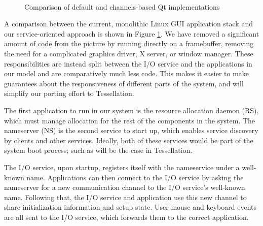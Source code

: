 \documentclass[letterpaper,twocolumn,11pt]{article}
\begin{document}
\begin{figure}[ht]
\begin{center}
     \\
  \end{center}
  \caption{Comparison of default and channels-based Qt implementations}
  \label{fig:implementation}
\end{figure}

A comparison between the current, monolithic Linux GUI application stack and our service-oriented approach is shown in Figure \ref{fig:implementation}. We have removed a significant amount of code from the picture by running directly on a framebuffer, removing the need for a complicated graphics driver, X server, or window manager. These responsibilities are instead split between the I/O service and the applications in our model and are comparatively much less code. This makes it easier to make guarantees about the responsiveness of different parts of the system, and will simplify our porting effort to Tessellation.

The first application to run in our system is the resource allocation daemon (RS), which must manage allocation for the rest of the components in the system. The nameserver (NS) is the second service to start up, which enables service discovery by clients and other services. Ideally, both of these services would be part of the system boot process; such as will be the case in Tessellation.

The I/O service, upon startup, registers itself with the nameservice under a well-known name. Applications can then connect to the I/O service by asking the nameserver for a new communication channel to the I/O service's well-known name. Following that, the I/O service and application use this new channel to share initialization information and setup state. User mouse and keyboard events are all sent to the I/O service, which forwards them to the correct application.
\end{document}
